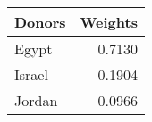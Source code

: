 \begin{tabular}{lr}
\toprule
Donors &  Weights \\
\midrule
 Egypt &   0.7130 \\
Israel &   0.1904 \\
Jordan &   0.0966 \\
\bottomrule
\end{tabular}
